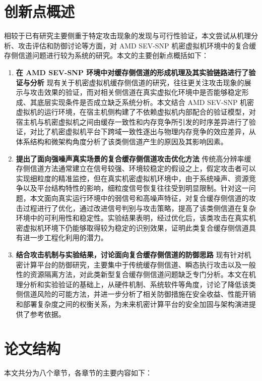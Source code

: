 \section{创新点概述}
相较于已有研究主要侧重于特定攻击现象的发现与可行性验证，本文尝试从机理分析、攻击评估和防御讨论等方面，对 AMD SEV-SNP 机密虚拟机环境中的复合缓存侧信道问题进行较为系统的研究。本文的主要创新点概括如下：

\begin{enumerate}
  \item \textbf{在 AMD SEV-SNP 环境中对缓存侧信道的形成机理及其实验链路进行了验证与分析} \newline
    现有关于机密虚拟机缓存侧信道的研究，往往更关注攻击现象的展示与攻击效果的验证，而对相关侧信道在真实虚拟化环境中是否能够稳定形成、其底层实现条件是否成立缺乏系统分析。本文结合 AMD SEV-SNP 机密虚拟机的运行环境，在宿主机侧构建了不依赖虚拟机内部配合的验证模型，对宿主机与机密虚拟机之间由缓存一致性和内存竞争所引发的时序差异进行了验证，对比了机密虚拟机平台下跨域一致性逐出与物理内存竞争的效应差异，从体系结构和微架构角度分析了该类侧信道产生的原因及其影响因素。

  \item \textbf{提出了面向强噪声真实场景的复合缓存侧信道攻击优化方法} \newline
    传统高分辨率缓存侧信道方法通常建立在信号较强、环境较稳定的假设之上，假定攻击者可以实现细粒度的精准监控，但在真实机密虚拟机环境中，由于系统噪声、资源竞争以及平台结构特性的影响，细粒度信号恢复往往受到明显限制。针对这一问题，本文面向真实运行环境中的弱信号和高噪声特征，对复合缓存侧信道的攻击过程进行了优化，通过改进信号判别与攻击策略，提高了该类侧信道在复杂环境中的可利用性和稳定性。实验结果表明，经过优化后，该类攻击在真实机密虚拟机环境下仍能够取得较为稳定的识别效果，证明此类复合缓存侧信道具有进一步工程化利用的潜力。

  \item \textbf{结合攻击机制与实验结果，讨论面向复合缓存侧信道的防御思路} \newline
    现有针对机密计算平台的防御研究，主要集中于传统缓存侧信道、瞬态执行攻击以及一般性的资源隔离方法，对此类新型复合缓存侧信道问题缺乏专门分析。本文在机理分析和实验验证的基础上，从硬件机制、系统软件等角度，讨论了降低该类侧信道风险的可能方法，并进一步分析了相关防御措施在安全收益、性能开销和部署复杂度之间的权衡关系，为未来机密计算平台的安全加固与架构演进提供了参考依据。
\end{enumerate}

\section{论文结构}
本文共分为八个章节，各章节的主要内容如下：

